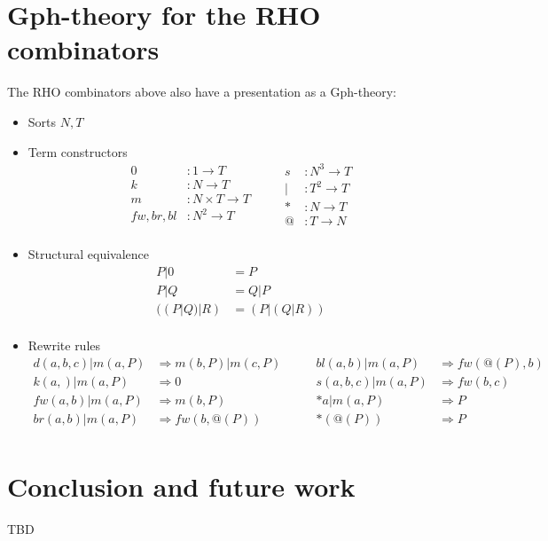 \documentclass{llncs}
\begin{document}
\section{Gph-theory for the RHO combinators}
The RHO combinators above also have a presentation as a Gph-theory:
\begin{itemize}
  \item Sorts $N, T$
  \item Term constructors
    \[\begin{array}{rl}
      0 &: 1 \to T \\
      k &: N \to T \\
      m &: N \times T \to T \\
      fw,br,bl &: N^2 \to T \\
    \end{array} \quad \quad
    \begin{array}{rl}
      s &: N^3 \to T \\
      | &: T^2 \to T \\
      * &: N \to T \\
      @ &: T \to N \\
    \end{array}\]
  \item Structural equivalence
    \[\begin{array}{rl}
      P | 0 & = P \\
      P | Q & = Q | P \\
      ((P | Q) | R) & = (P | (Q | R)) \\
    \end{array}\]
  \item Rewrite rules
    \[\begin{array}{rl}
      d(a,b,c) | m(a,P) & \Rightarrow m(b,P) | m(c,P) \\
      k(a,) | m(a,P) & \Rightarrow 0 \\
      fw(a,b) | m(a,P) & \Rightarrow m(b,P) \\
      br(a,b) | m(a,P) & \Rightarrow fw(b,@(P)) \\
    \end{array} \quad \quad
    \begin{array}{rl}
      bl(a,b) | m(a,P) & \Rightarrow fw(@(P),b) \\
      s(a,b,c) | m(a,P) & \Rightarrow fw(b,c) \\
      *a | m(a,P) & \Rightarrow P \\
      *(@(P)) & \Rightarrow P \\
    \end{array}\]
\end{itemize}

\section{Conclusion and future work}
TBD



\end{document}

